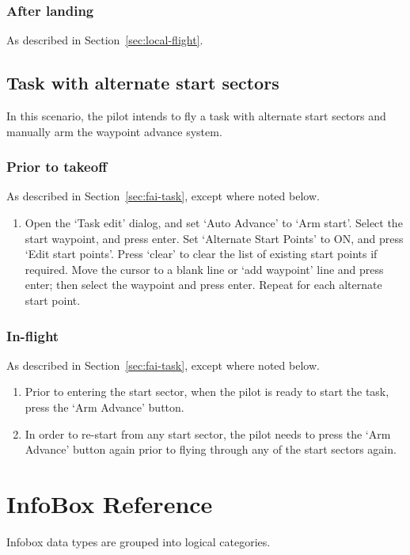 \documentclass[a4paper,12pt]{refrep}
\newcommand{\InfoBox}[0]{{InfoBox}}
\begin{document}
\subsection*{After landing}
As described in Section~\ref{sec:local-flight}.

\section{Task with alternate start sectors}

In this scenario, the pilot intends to fly a task with 
alternate start sectors and manually arm the waypoint advance system.

\subsection*{Prior to takeoff}
As described in Section~\ref{sec:fai-task}, except where noted below.
\begin{enumerate}
\item Open the `Task edit' dialog, and set `Auto Advance' to `Arm start'.
  Select the start waypoint, and press enter.  Set `Alternate Start
  Points' to ON, and press `Edit start points'.  Press `clear' to
  clear the list of existing start points if required.  Move the
  cursor to a blank line or `add waypoint' line and press enter; then
  select the waypoint and press enter.  Repeat for each alternate
  start point.
\end{enumerate}

\subsection*{In-flight}
As described in Section~\ref{sec:fai-task}, except where noted below.
\begin{enumerate}
\item 
Prior to entering the start sector, when the pilot is ready to start
the task, press the `Arm Advance' button.

\item 
In order to re-start from any start sector, the pilot needs to press
the `Arm Advance' button again prior to flying through any of the
start sectors again.
\end{enumerate}


\chapter{{\InfoBox} Reference}\label{cha:infobox}
Infobox data types are grouped into logical categories.
%
\end{document}
